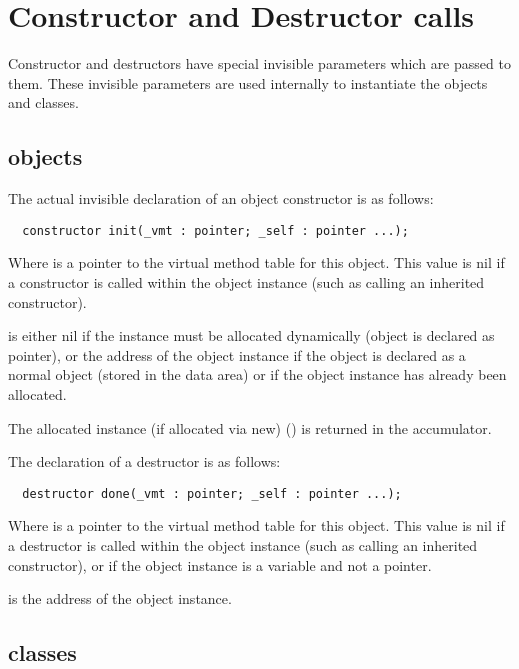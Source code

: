 \section{Constructor and Destructor calls}
\label{se:ConsDest}

Constructor and destructors have special invisible parameters
which are passed to them. These invisible parameters are used
internally to instantiate the objects and classes. 

\subsection{objects}

The actual invisible declaration of an object constructor
is as follows:

\begin{verbatim}
  constructor init(_vmt : pointer; _self : pointer ...);
\end{verbatim}

Where  is a pointer to the virtual method table
for this object. This value is nil if a constructor is called
within the object instance (such as calling an inherited constructor).

 is either nil if the instance must be allocated 
dynamically (object is declared as pointer), or the address of 
the object instance if the object is declared as a normal object
(stored in the data area) or if the object instance has already 
been allocated.

The allocated instance (if allocated via new) () 
is returned in the accumulator.


The declaration of a destructor is as follows:

\begin{verbatim}
  destructor done(_vmt : pointer; _self : pointer ...);
\end{verbatim}

Where  is a pointer to the virtual method table
for this object. This value is nil if a destructor is called
within the object instance (such as calling an inherited constructor),
or if the object instance is a variable and not a pointer.

 is the address of the object instance.


\subsection{classes}

